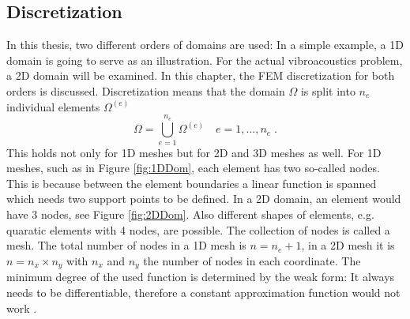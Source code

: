 \documentclass[%
  a4paper,oneside,%
  11pt,%
  smallchapters,
  green,%
  rgb, <cmyk>
  ]{tubsbook}
\begin{document}
\subsection{Discretization}
In this thesis, two different orders of domains are used: In a simple example, a 1D domain is going to serve as an illustration. For the actual vibroacoustics problem, a 2D domain will be examined. In this chapter, the FEM discretization for both orders is discussed.
%
Discretization means that the domain $\Omega$ is split into $n_e$ individual elements $\Omega^{(e)}$
\begin{equation}
\Omega = \bigcup_{e=1}^{n_e} \Omega^{(e)} \quad e = 1,...,n_e \;.
\end{equation}
This holds not only for 1D meshes but for 2D and 3D meshes as well.
For 1D meshes, such as in Figure \ref{fig:1DDom}, each element has two so-called nodes. This is because between the element boundaries a linear function is spanned which needs two support points to be defined.  In a 2D domain, an element would have 3 nodes, see Figure \ref{fig:2DDom}. Also different shapes of elements, e.g. quaratic elements with 4 nodes, are possible. The collection of nodes is called a mesh. The total number of nodes in a 1D mesh is $n = n_e + 1$, in a 2D mesh it is $n = n_x \times n_y$ with $n_x$ and $n_y$ the number of nodes in each coordinate. The minimum degree of the used function is determined by the weak form: It always needs to be differentiable, therefore a constant approximation function would not work \cite{atalla2015}. 
\end{document}
